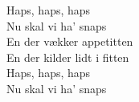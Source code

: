 Haps, haps, haps\\
Nu skal vi ha' snaps\\
En der vækker appetitten\\
En der kilder lidt i fitten\\
Haps, haps, haps\\
Nu skal vi ha' snaps

